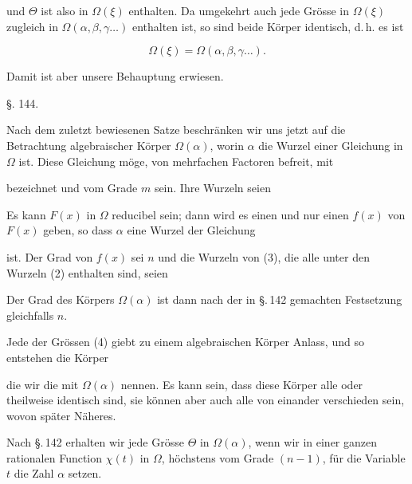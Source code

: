 

und $\Theta$ ist also in $\Omega(\xi)$ enthalten. Da umgekehrt auch jede
Grösse in $\Omega(\xi)$ zugleich in $\Omega(\alpha, \beta, \gamma \dots)$ enthalten ist, so sind
beide Körper identisch, d.\,h. es ist

\[
\Omega(\xi) = \Omega(\alpha, \beta, \gamma \dots).
\]

Damit ist aber unsere Behauptung erwiesen.

\begin{center}
§. 144.

\end{center}

Nach dem zuletzt bewiesenen Satze beschränken wir uns
jetzt auf die Betrachtung algebraischer Körper $\Omega(\alpha)$, worin $\alpha$
die Wurzel einer Gleichung in $\Omega$ ist. Diese Gleichung möge,
von mehrfachen Factoren befreit, mit


bezeichnet und vom Grade $m$ sein. Ihre Wurzeln seien


Es kann $F(x)$ in $\Omega$ reducibel sein; dann wird es einen und
nur einen  $f(x)$ von $F(x)$ geben, so
dass $\alpha$ eine Wurzel der Gleichung


ist. Der Grad von $f(x)$ sei $n$ und die Wurzeln von (3), die alle
unter den Wurzeln (2) enthalten sind, seien


Der Grad des Körpers $\Omega(\alpha)$ ist dann nach der in §.\,142
gemachten Festsetzung gleichfalls $n$.

Jede der Grössen (4) giebt zu einem algebraischen Körper
Anlass, und so entstehen die Körper


die wir die mit $\Omega(\alpha)$  nennen. Es kann
sein, dass diese Körper alle oder theilweise identisch sind, sie
können aber auch alle von einander verschieden sein, wovon
später Näheres.

Nach §.\,142 erhalten wir jede Grösse $\Theta$ in $\Omega(\alpha)$, wenn wir
in einer ganzen rationalen Function $\chi(t)$ in $\Omega$, höchstens vom
Grade $(n-1)$, für die Variable $t$ die Zahl $\alpha$ setzen.
